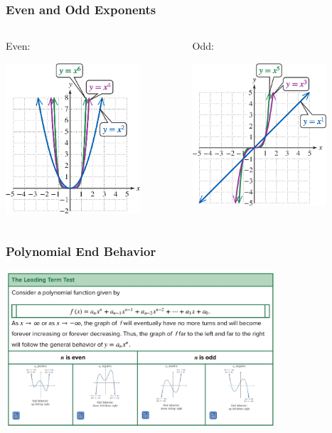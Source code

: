\documentclass{beamer}
\begin{document}
\begin{frame}\frametitle{Even and Odd Exponents}
\begin{columns}
\begin{column}{5.5cm}

Even:
\begin{center}
\includegraphics[width=5cm]{fig/polyeven.png}
\end{center}



\end{column}

\begin{column}{5.5cm}
Odd:
\begin{center}
\includegraphics[width=5cm]{fig/polyodd.png}
\end{center}

\end{column}
\end{columns}

\end{frame}

\begin{frame}\frametitle{Polynomial End Behavior}

\begin{center}
\includegraphics[width=10cm]{fig/poly2.jpg}
\end{center}

\end{frame}
\end{document}
